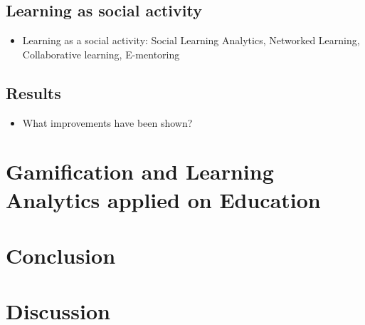 \documentclass[10pt]{article}
\begin{document}
\subsection{Learning as social activity}
\begin{itemize}
\item Learning as a social activity: Social Learning Analytics, Networked Learning, Collaborative learning, E-mentoring
\end{itemize}
\subsection{Results}
\begin{itemize}
\item What improvements have been shown?
\end{itemize}


\section{Gamification and Learning Analytics applied on Education}

\section{Conclusion}

\section{Discussion}


\pagebreak


\end{document}
